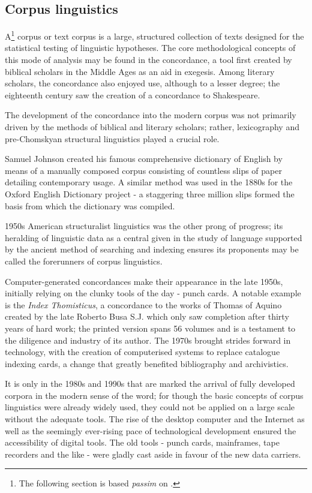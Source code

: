 \documentclass[10pt,a4paper,twoside,openright,titlepage,fleqn,%
               headinclude,,footinclude,BCOR5mm,%
               numbers=noenddot,cleardoublepage=empty,%
               tablecaptionabove]{scrbook}
\begin{document}
\subsection{Corpus linguistics}
A\footnote{The following section is based \emph{passim} on
\citet{okeeffe2010}.} corpus or text corpus is a large, structured collection
of texts designed for the statistical testing of linguistic hypotheses. The
core methodological concepts of this mode of analysis may be found in the
concordance, a tool first created by biblical scholars in the Middle Ages as an
aid in exegesis. Among literary scholars, the concordance also enjoyed use,
although to a lesser degree; the eighteenth century saw the creation of a
concordance to Shakespeare.

 The development of the concordance into the modern corpus was not primarily
 driven by the methods of biblical and literary scholars; rather, lexicography
 and pre-Chomskyan structural linguistics played a crucial role.

 Samuel Johnson created his famous comprehensive dictionary of English by means
 of a manually composed corpus consisting of countless slips of paper detailing
 contemporary usage. A similar method was used in the 1880s for the Oxford
 English Dictionary project - a staggering three million slips formed the basis
 from which the dictionary was compiled.

 1950s American structuralist linguistics was the other prong of progress; its
 heralding of linguistic data as a central given in the study of language
 supported by the ancient method of searching and indexing ensures its
 proponents may be called the forerunners of corpus linguistics.

Computer-generated concordances make their appearance in the late 1950s,
initially relying on the clunky tools of the day - punch cards. A notable
example is the \emph{Index Thomisticus}, a concordance
to the works of Thomas of Aquino created by the late Roberto Busa S.J. which
only saw completion after thirty years of hard work; the printed version spans
56 volumes and is a testament to the diligence and industry of its author. The
1970s brought strides forward in technology, with the creation of computerised
systems to replace catalogue indexing cards, a change that greatly benefited
bibliography and archivistics.

 It is only in the 1980s and 1990s that are marked the arrival of fully
 developed corpora in the modern sense of the word; for though the basic
 concepts of corpus linguistics were already widely used, they could not be
 applied on a large scale without the adequate tools. The rise of the desktop
 computer and the Internet as well as the seemingly ever-rising pace of
 technological development ensured the accessibility of digital tools.  The old
 tools - punch cards, mainframes, tape recorders and the like - were gladly
 cast aside in favour of the new data carriers.
\end{document}
